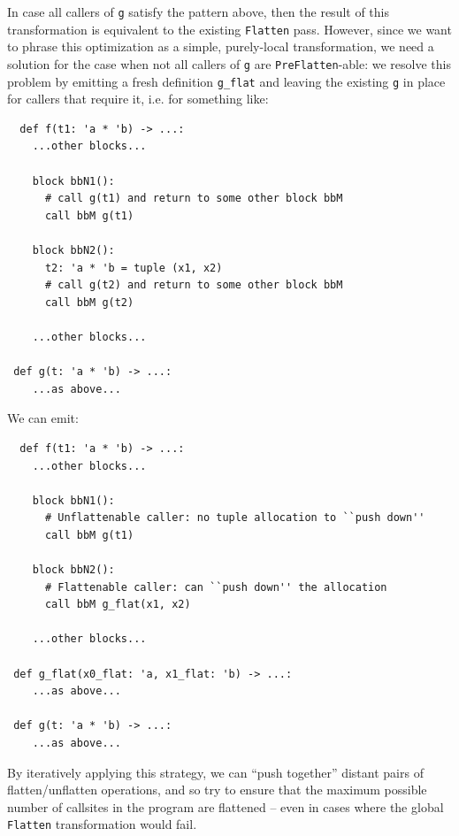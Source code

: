 \documentclass[leqno,11pt]{article}
\begin{document}
In case all callers of \texttt{g} satisfy the pattern above, then the result of
this transformation is equivalent to the existing \texttt{Flatten} pass.
However, since we want to phrase this optimization as a simple, purely-local
transformation, we need a solution for the case when not all callers of
\texttt{g} are \texttt{PreFlatten}-able: we resolve this problem by emitting a
fresh definition \texttt{g\_flat} and leaving the existing \texttt{g} in place
for callers that require it, i.e. for something like:
\begin{verbatim}
  def f(t1: 'a * 'b) -> ...:
    ...other blocks...

    block bbN1():
      # call g(t1) and return to some other block bbM
      call bbM g(t1)

    block bbN2():
      t2: 'a * 'b = tuple (x1, x2)
      # call g(t2) and return to some other block bbM
      call bbM g(t2)

    ...other blocks...

 def g(t: 'a * 'b) -> ...:
    ...as above...
\end{verbatim}
We can emit:
\begin{verbatim}
  def f(t1: 'a * 'b) -> ...:
    ...other blocks...

    block bbN1():
      # Unflattenable caller: no tuple allocation to ``push down''
      call bbM g(t1)

    block bbN2():
      # Flattenable caller: can ``push down'' the allocation
      call bbM g_flat(x1, x2)

    ...other blocks...

 def g_flat(x0_flat: 'a, x1_flat: 'b) -> ...:
    ...as above...

 def g(t: 'a * 'b) -> ...:
    ...as above...
\end{verbatim}
By iteratively applying this strategy, we can ``push together'' distant pairs of
flatten/unflatten operations, and so try to ensure that the maximum possible
number of callsites in the program are flattened -- even in cases where the
global \texttt{Flatten} transformation would fail.
\end{document}
